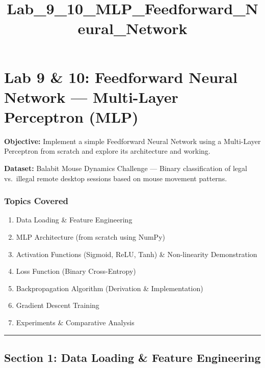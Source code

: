 \documentclass[11pt]{article}
\title{Lab\_9\_10\_MLP\_Feedforward\_Neural\_Network}
\providecommand{\tightlist}{%
      \setlength{\itemsep}{0pt}\setlength{\parskip}{0pt}}
\begin{document}
    
    \maketitle
    
    

    
    \section{Lab 9 \& 10: Feedforward Neural Network --- Multi-Layer
Perceptron
(MLP)}\label{lab-9-10-feedforward-neural-network-multi-layer-perceptron-mlp}

\textbf{Objective:} Implement a simple Feedforward Neural Network using
a Multi-Layer Perceptron from scratch and explore its architecture and
working.

\textbf{Dataset:} Balabit Mouse Dynamics Challenge --- Binary
classification of legal vs.~illegal remote desktop sessions based on
mouse movement patterns.

\subsubsection{Topics Covered}\label{topics-covered}

\begin{enumerate}
\def\labelenumi{\arabic{enumi}.}
\tightlist
\item
  Data Loading \& Feature Engineering
\item
  MLP Architecture (from scratch using NumPy)
\item
  Activation Functions (Sigmoid, ReLU, Tanh) \& Non-linearity
  Demonstration
\item
  Loss Function (Binary Cross-Entropy)
\item
  Backpropagation Algorithm (Derivation \& Implementation)
\item
  Gradient Descent Training
\item
  Experiments \& Comparative Analysis
\end{enumerate}

    \begin{center}\rule{0.5\linewidth}{0.5pt}\end{center}

\subsection{Section 1: Data Loading \& Feature
Engineering}\label{section-1-data-loading-feature-engineering}
\end{document}
